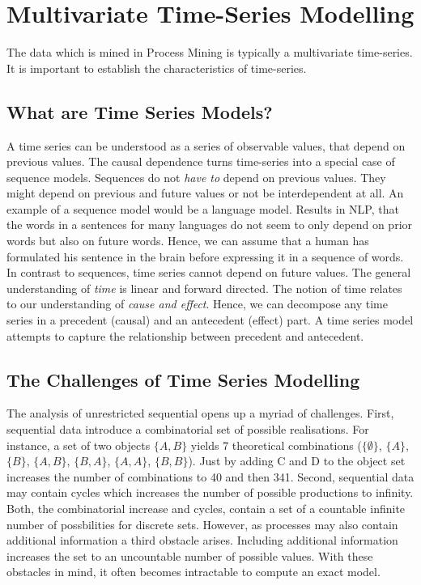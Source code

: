 \documentclass[12pt,a4paper]{report}
\begin{document}
\section{Multivariate Time-Series Modelling}
\label{sec:sequences}
The data which is mined in Process Mining is typically a multivariate time-series. It is important to establish the characteristics of time-series.

\subsection{What are Time Series Models?}
A time series can be understood as a series of observable values, that depend on previous values. The causal dependence turns time-series into a special case of sequence models. Sequences do not \emph{have to} depend on previous values. They might depend on previous and future values or not be interdependent at all. An example of a sequence model would be a language model. Results in \gls{NLP}, that the words in a sentences for many languages do not seem to only depend on prior words but also on future words\needscite. Hence, we can assume that a human has formulated his sentence in the brain before expressing it in a sequence of words\needscite. In contrast to sequences, time series cannot depend on future values. The general understanding of \emph{time} is linear and forward directed\needscite. The notion of time relates to our understanding of \emph{cause and effect}. Hence, we can decompose any time series in a precedent (causal) and an antecedent (effect) part. A time series model attempts to capture the relationship between precedent and antecedent.

\subsection{The Challenges of Time Series Modelling}
The analysis of unrestricted sequential opens up a myriad of challenges. First, sequential data introduce a combinatorial set of possible realisations. For instance, a set of two objects $\{A,B\}$ yields 7 theoretical combinations ($\{\emptyset\}$, $\{A\}$, $\{B\}$, $\{A,B\}$, $\{B,A\}$, $\{A,A\}$, $\{B,B\}$). Just by adding C and D to the object set increases the number of combinations to 40 and then 341. %
Second, sequential data may contain cycles which increases the number of possible productions to infinity\needscite. Both, the combinatorial increase and cycles, contain a set of a countable infinite number of possbilities for discrete sets. However, as processes may also contain additional information a third obstacle arises. Including additional information increases the set to an uncountable number of possible values. With these obstacles in mind, it often becomes intractable to compute an exact model.
\end{document}
